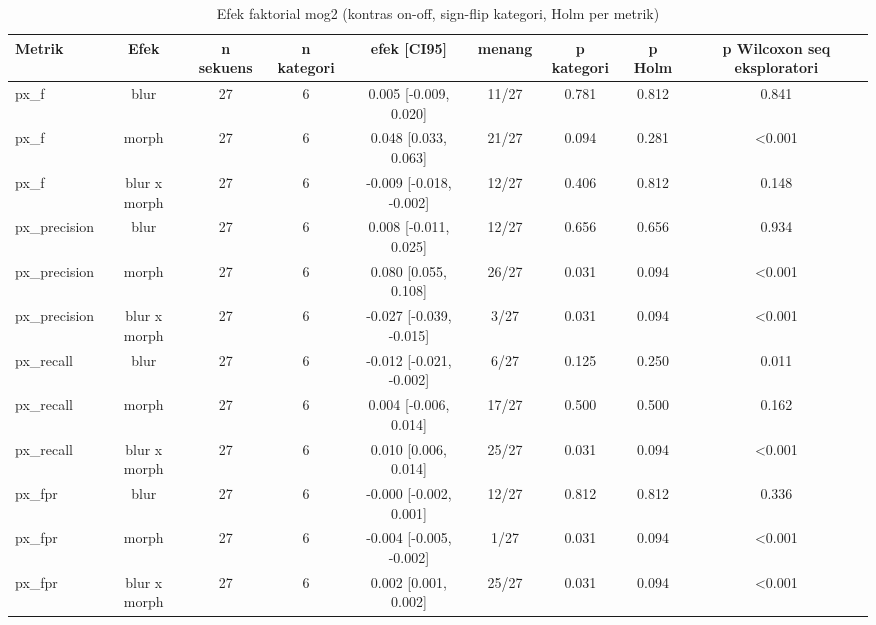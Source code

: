 \begin{table}[t]
\centering
\caption{Efek faktorial mog2 (kontras on-off, sign-flip kategori, Holm per metrik)}
\label{tab:stats_ablation_mog2}
\begin{tabular}{lcccccccc}
\toprule
Metrik & Efek & n sekuens & n kategori & efek [CI95] & menang & p kategori & p Holm & p Wilcoxon seq eksploratori \\
\midrule
px\_f & blur & 27 & 6 & 0.005 [-0.009, 0.020] & 11/27 & 0.781 & 0.812 & 0.841 \\
px\_f & morph & 27 & 6 & 0.048 [0.033, 0.063] & 21/27 & 0.094 & 0.281 & <0.001 \\
px\_f & blur x morph & 27 & 6 & -0.009 [-0.018, -0.002] & 12/27 & 0.406 & 0.812 & 0.148 \\
px\_precision & blur & 27 & 6 & 0.008 [-0.011, 0.025] & 12/27 & 0.656 & 0.656 & 0.934 \\
px\_precision & morph & 27 & 6 & 0.080 [0.055, 0.108] & 26/27 & 0.031 & 0.094 & <0.001 \\
px\_precision & blur x morph & 27 & 6 & -0.027 [-0.039, -0.015] & 3/27 & 0.031 & 0.094 & <0.001 \\
px\_recall & blur & 27 & 6 & -0.012 [-0.021, -0.002] & 6/27 & 0.125 & 0.250 & 0.011 \\
px\_recall & morph & 27 & 6 & 0.004 [-0.006, 0.014] & 17/27 & 0.500 & 0.500 & 0.162 \\
px\_recall & blur x morph & 27 & 6 & 0.010 [0.006, 0.014] & 25/27 & 0.031 & 0.094 & <0.001 \\
px\_fpr & blur & 27 & 6 & -0.000 [-0.002, 0.001] & 12/27 & 0.812 & 0.812 & 0.336 \\
px\_fpr & morph & 27 & 6 & -0.004 [-0.005, -0.002] & 1/27 & 0.031 & 0.094 & <0.001 \\
px\_fpr & blur x morph & 27 & 6 & 0.002 [0.001, 0.002] & 25/27 & 0.031 & 0.094 & <0.001 \\
\bottomrule
\end{tabular}
\end{table}
